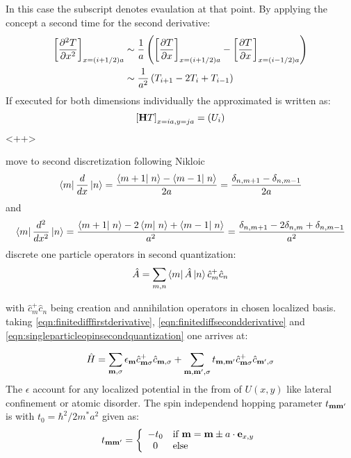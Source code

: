 In this case the subscript denotes evaulation at that point. By applying the concept a second time for the second derivative:
\begin{align}
  \left[\frac{\partial^2 T}{\partial x^2}\right]_{x=(i+1/2)a} &\sim \frac{1}{a}\left( \left[\frac{\partial T}{\partial x}\right]_{x=(i+1/2)a}-\left[\frac{\partial T}{\partial x}\right]_{x=(i-1/2)a} \right) \\
  &\sim \frac{1}{a^2}\left(T_{i+1}-2T_{i}+T_{i-1}\right)
  \label{ApproximateSecondDerivative}
\end{align}
If executed for both dimensions individually the approximated \hamil{} is written as:
\begin{equation}
  \left[\mathbf{H}T\right]_{x=ia,y=ja}= \left(U_{i}\right)
  \label{<++>}
\end{equation}<++>

move to second discretization following Nikloic
\begin{align}
	\bra{m} \d{}{x} \ket{n} = \frac{\braket{m+1}{n}-\braket{m-1}{n}}{2a} = \frac{\delta_{n,m+1}-\delta_{n,m-1}}{2a}
	\label{eqn:finitedifffirstderivative}
\end{align}
and
\begin{align}
	\bra{m} \dd{}{x} \ket{n} = \frac{\braket{m+1}{n}-2\braket{m}{n}+\braket{m-1}{n}}{a^2} = \frac{\delta_{n,m+1}-2\delta_{n,m}+\delta_{n,m-1}}{a^2}
	\label{eqn:finitediffsecondderivative}
\end{align}
discrete one particle operators in second quantization:
\begin{align}
	\hat{A} = \sum_{m,n} \left< m \right|\hat{A}\left| n \right> \hat{c}^+_m \hat{c}_n
 \label{eqn:singleparticleopinsecondquantization}
\end{align}

with $\hat{c}^+_m \hat{c}_n $ being creation and annihilation operators in chosen localized basis.
taking \ref{eqn:finitedifffirstderivative}, \ref{eqn:finitediffsecondderivative} and \ref{eqn:singleparticleopinsecondquantization} one arrives at:

\begin{align}
	\hat{H} = \sum_{\mathbf{m},\sigma} \epsilon_{\mathbf{m}} \hat{c}^+_{\mathbf{m}\sigma} \hat{c}_{\mathbf{m},\sigma} +
	\sum_{\mathbf{m},\mathbf{m'},\sigma} t_{\mathbf{m},\mathbf{m'}} \hat{c}^+_{\mathbf{m}\sigma} \hat{c}_{\mathbf{m'},\sigma}
	\label{eqn:discretizedeffectivemassHamil}
\end{align}
The $\epsilon$ account for any localized potential in the from of $U(x,y)$ like lateral confinement or atomic disorder.
The spin independend hopping parameter $t_{\mathbf{m}\mathbf{m'}}$ is with $t_0 = \hbar^2/2m^*a^2$  given as:
\begin{align}
t_{\mathbf{m}\mathbf{m'}} = \left\{ \begin{array}[c]{cl} -t_0 & \text{if } \mathbf{m} = \mathbf{m} \pm a \cdot \mathbf{e}_{x,y} \\ 0 & \text{else} \end{array} \right.
	\label{eqn:t0hopping}
\end{align}

